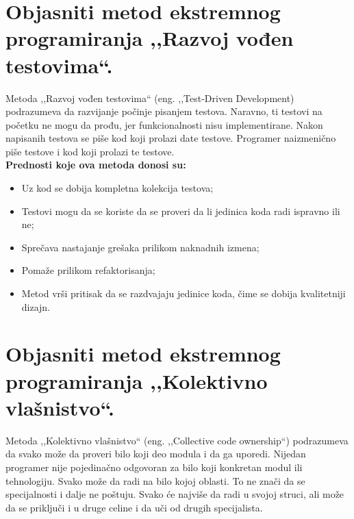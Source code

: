 \documentclass[a4paper]{article}
\begin{document}
\section{Objasniti metod ekstremnog programiranja ,,Razvoj vođen testovima``.}
  Metoda ,,Razvoj vođen testovima`` (eng. ,,Test-Driven Development) podrazumeva da razvijanje
  počinje pisanjem testova. Naravno, ti testovi na početku ne mogu da prođu, jer funkcionalnosti
  nisu implementirane. Nakon napisanih testova se piše kod koji prolazi date testove. 
  Programer naizmenično piše testove i kod koji prolazi te testove. \\
  \textbf{Prednosti koje ova metoda donosi su:}
  \begin{itemize}
    \item Uz kod se dobija kompletna kolekcija testova;
    \item Testovi mogu da se koriste da se proveri da li jedinica koda radi ispravno ili ne;
    \item Sprečava nastajanje grešaka prilikom naknadnih izmena;
    \item Pomaže prilikom refaktorisanja;
    \item Metod vrši pritisak da se razdvajaju jedinice koda, čime se dobija kvalitetniji dizajn.
  \end{itemize}

\section{Objasniti metod ekstremnog programiranja ,,Kolektivno vlašnistvo``.}
  Metoda ,,Kolektivno vlašnistvo`` (eng. ,,Collective code ownership``) podrazumeva
  da svako može da proveri bilo koji deo modula i da ga uporedi. Nijedan programer nije
  pojedinačno odgovoran za bilo koji konkretan modul ili tehnologiju. Svako može da 
  radi na bilo kojoj oblasti. To ne znači da se specijalnosti i dalje ne poštuju. Svako će
  najviše da radi u svojoj struci, ali može da se priključi i u druge celine i da uči od
  drugih specijalista.
\end{document}
